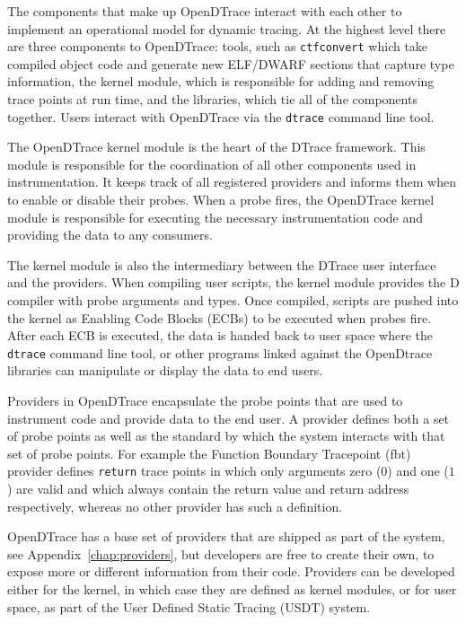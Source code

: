 The components that make up OpenDTrace interact with each other to
implement an operational model for dynamic tracing.  At the highest
level there are three components to OpenDTrace: tools, such as
\texttt{ctfconvert} which take compiled object code and generate new
ELF/DWARF sections that capture type information, the kernel module,
which is responsible for adding and removing trace points at run time,
and the libraries, which tie all of the components together.  Users
interact with OpenDTrace via the \texttt{dtrace} command line tool.

The OpenDTrace kernel module is the heart of the DTrace
framework. This module is responsible for the coordination of all
other components used in instrumentation. It keeps track of all
registered providers and informs them when to enable or disable their
probes. When a probe fires, the OpenDTrace kernel module is
responsible for executing the necessary instrumentation code and
providing the data to any consumers.

The kernel module is also the intermediary between the DTrace user
interface and the providers. When compiling user scripts, the kernel
module provides the D compiler with probe arguments and types. Once
compiled, scripts are pushed into the kernel as Enabling Code Blocks
(ECBs) to be executed when probes fire. After each ECB is executed,
the data is handed back to user space where the \texttt{dtrace}
command line tool, or other programs linked against the OpenDtrace
libraries can manipulate or display the data to end users.

Providers in OpenDTrace encapsulate the probe points that are used to
instrument code and provide data to the end user. A provider defines
both a set of probe points as well as the standard by which the system
interacts with that set of probe points.  For example the Function
Boundary Tracepoint (fbt) provider defines \texttt{return} trace
points in which only arguments zero ($0$) and one ($1$) are valid and
which always contain the return value and return address
respectively, whereas no other provider has such a definition.

OpenDTrace has a base set of providers that are shipped as part of the
system, see Appendix~\ref{chap:providers}, but developers are free to
create their own, to expose more or different information from their
code. Providers can be developed either for the kernel, in which case
they are defined as kernel modules, or for user space, as part of the
User Defined Static Tracing (USDT) system.

